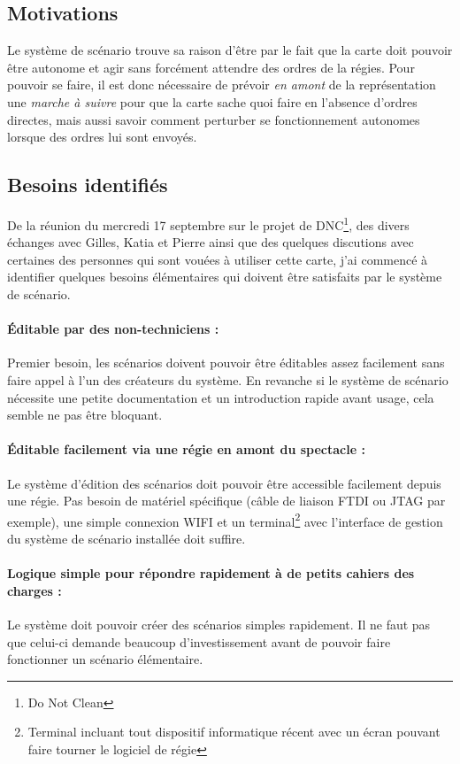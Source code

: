 \subsection{Motivations}
Le système de scénario trouve sa raison d'être par le fait que la carte doit pouvoir être autonome et agir sans forcément attendre des ordres de la régies. Pour pouvoir se faire, il est donc nécessaire de prévoir \textit{en amont} de la représentation une \textit{marche à suivre} pour que la carte sache quoi faire en l'absence d'ordres directes, mais aussi savoir comment perturber se fonctionnement autonomes lorsque des ordres lui sont envoyés.
\subsection{Besoins identifiés}
De la réunion du mercredi 17 septembre sur le projet de DNC\footnote{Do Not Clean}, des divers échanges avec Gilles, Katia et Pierre ainsi que des quelques discutions avec certaines des personnes qui sont vouées à utiliser cette carte, j'ai commencé à identifier quelques besoins élémentaires qui doivent être satisfaits par le système de scénario.
\paragraph{Éditable par des non-techniciens :}
Premier besoin, les scénarios doivent pouvoir être éditables assez facilement sans faire appel à l'un des créateurs du système. En revanche si le système de scénario nécessite une petite documentation et un introduction rapide avant usage, cela semble ne pas être bloquant.
\paragraph{Éditable facilement via une régie en amont du spectacle :}
Le système d'édition des scénarios doit pouvoir être accessible facilement depuis une régie. Pas besoin de matériel spécifique (câble de liaison FTDI ou JTAG par exemple), une simple connexion WIFI et un terminal\footnote{Terminal incluant tout dispositif informatique récent avec un écran pouvant faire tourner le logiciel de régie} avec l'interface de gestion du système de scénario installée doit suffire.
\paragraph{Logique simple pour répondre rapidement à de petits cahiers des charges :}
Le système doit pouvoir créer des scénarios simples rapidement. Il ne faut pas que celui-ci demande beaucoup d'investissement avant de pouvoir faire fonctionner un scénario élémentaire.
